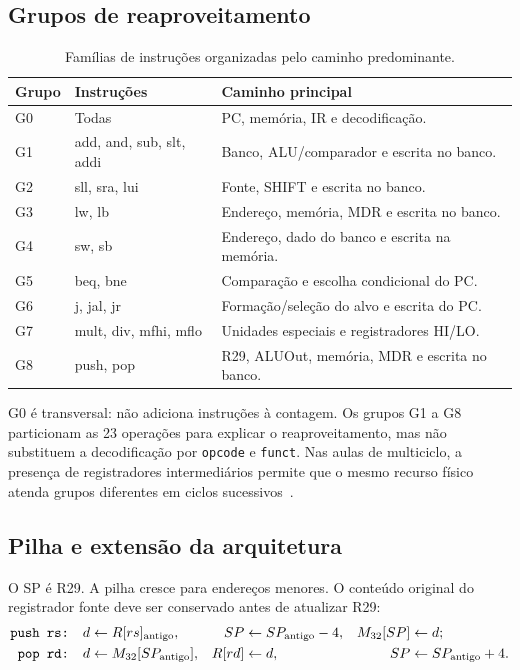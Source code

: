 \subsection{Grupos de reaproveitamento}\label{subsec:grupos}

\begin{table}[H]\centering\small
\caption{Famílias de instruções organizadas pelo caminho predominante.}\label{tab:grupos}
\begin{tabularx}{\linewidth}{@{}p{1.2cm}p{5.3cm}X@{}}\toprule
Grupo & Instruções & Caminho principal \\\midrule
G0 & Todas & PC, memória, IR e decodificação. \\
G1 & add, and, sub, slt, addi & Banco, ALU/comparador e escrita no banco. \\
G2 & sll, sra, lui & Fonte, SHIFT e escrita no banco. \\
G3 & lw, lb & Endereço, memória, MDR e escrita no banco. \\
G4 & sw, sb & Endereço, dado do banco e escrita na memória. \\
G5 & beq, bne & Comparação e escolha condicional do PC. \\
G6 & j, jal, jr & Formação/seleção do alvo e escrita do PC. \\
G7 & mult, div, mfhi, mflo & Unidades especiais e registradores HI/LO. \\
G8 & push, pop & R29, ALUOut, memória, MDR e escrita no banco. \\\bottomrule
\end{tabularx}
\end{table}

G0 é transversal: não adiciona instruções à contagem. Os grupos G1 a G8 particionam as 23 operações para explicar o reaproveitamento, mas não substituem a decodificação por \texttt{opcode} e \texttt{funct}. Nas aulas de multiciclo, a presença de registradores intermediários permite que o mesmo recurso físico atenda grupos diferentes em ciclos sucessivos~\cite{aulas}.

\subsection{Pilha e extensão da arquitetura}\label{sec:pilha}

O SP é R29. A pilha cresce para endereços menores. O conteúdo original do registrador fonte deve ser conservado antes de atualizar R29:
\begin{align}
\text{\texttt{push rs:}}\quad & d \gets R[rs]_{\mathrm{antigo}}, & SP &\gets SP_{\mathrm{antigo}}-4, & M_{32}[SP] &\gets d; \label{eq:push}\\
\text{\texttt{pop rd:}}\quad & d \gets M_{32}[SP_{\mathrm{antigo}}], & R[rd] &\gets d, & SP &\gets SP_{\mathrm{antigo}}+4. \label{eq:pop}
\end{align}

